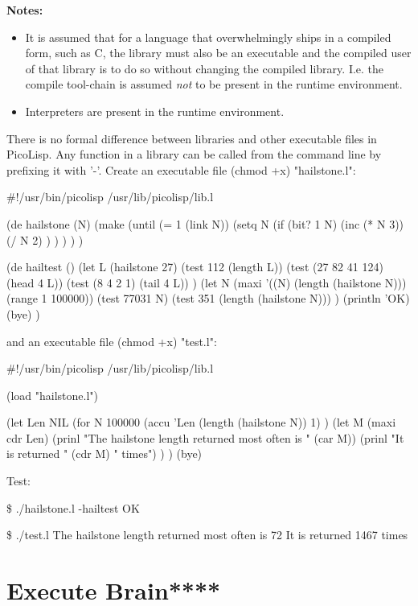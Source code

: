 \textbf{Notes:}

\begin{itemize}
\item
  It is assumed that for a language that overwhelmingly ships in a
  compiled form, such as C, the library must also be an executable and
  the compiled user of that library is to do so without changing the
  compiled library. I.e. the compile tool-chain is assumed \emph{not} to
  be present in the runtime environment.
\item
  Interpreters are present in the runtime environment.
\end{itemize}


\begin{wideverbatim}

There is no formal difference between libraries and other executable files in
PicoLisp. Any function in a library can be called from the command line by
prefixing it with '-'. Create an executable file (chmod +x) "hailstone.l":

#!/usr/bin/picolisp /usr/lib/picolisp/lib.l

(de hailstone (N)
   (make
      (until (= 1 (link N))
         (setq N
            (if (bit? 1 N)
               (inc (* N 3))
               (/ N 2) ) ) ) ) )

(de hailtest ()
   (let L (hailstone 27)
      (test 112 (length L))
      (test (27 82 41 124) (head 4 L))
      (test (8 4 2 1) (tail 4 L)) )
   (let N (maxi '((N) (length (hailstone N))) (range 1 100000))
      (test 77031 N)
      (test 351 (length (hailstone N))) )
   (println 'OK)
   (bye) )

and an executable file (chmod +x) "test.l":

#!/usr/bin/picolisp /usr/lib/picolisp/lib.l

(load "hailstone.l")

(let Len NIL
   (for N 100000
      (accu 'Len (length (hailstone N)) 1) )
   (let M (maxi cdr Len)
      (prinl "The hailstone length returned most often is " (car M))
      (prinl "It is returned " (cdr M) " times") ) )
(bye)

Test:

\$ ./hailstone.l -hailtest
OK

\$ ./test.l
The hailstone length returned most often is 72
It is returned 1467 times

\end{wideverbatim}

\pagebreak{}
\section*{Execute Brain****}

